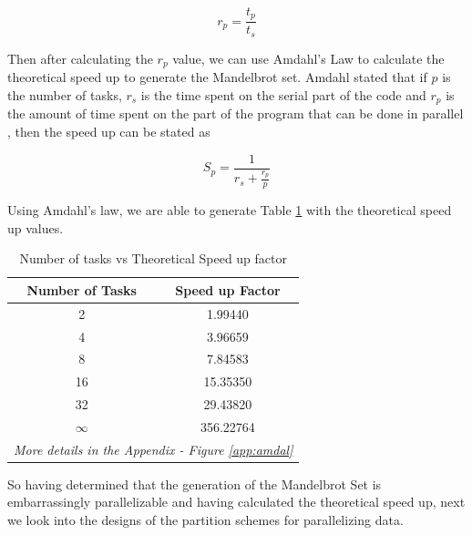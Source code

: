 \documentclass[conference]{IEEEtran}
\begin{document}
			\begin{equation}
				r_p = \frac{t_p}{t_s} \label{rp}
			\end{equation}
			
			Then after calculating the $r_p$ value, we can use Amdahl's Law \cite{amdahl1967validity} to calculate the theoretical speed up to generate the Mandelbrot set. Amdahl stated that if $p$ is the number of tasks, $r_s$ is the time spent on the serial part of the code and $r_p$ is the amount of time spent on the part of the program that can be done in parallel \cite{gustafson1988reevaluating}, then the speed up can be stated as 
			
			\begin{equation}
				S_p = \frac{1}{r_s + \frac{r_p}{p}}
			\end{equation}
			
			Using Amdahl's law, we are able to generate Table \ref{theoratical} with the theoretical speed up values.
			
			\begin{table}[!h]\caption{Number of tasks vs Theoretical Speed up factor}
				\begin{center}
					\renewcommand{\arraystretch}{1.2}
					
					\begin{tabular}{|c|c|} 
						\hline
						\textbf{Number of Tasks} & \textbf{Speed up Factor} \\ \hline
						2                  & 1.99440                     \\
						4                  & 3.96659                     \\
						8                   & 7.84583                     \\
						16                 & 15.35350                       \\
						32                & 29.43820                      \\
						 $\infty$      & 356.22764                       \\ \hline
						 \multicolumn{2}{l}{\textit{More details in the Appendix - Figure \ref{app:amdal}}	 }
					\end{tabular}
				\label{theoratical}
				\end{center}
			\end{table}
			
			So having determined that the generation of the Mandelbrot Set is embarrassingly parallelizable and having calculated the theoretical speed up, next we look into the designs of the partition schemes for parallelizing data.
	
\end{document}

